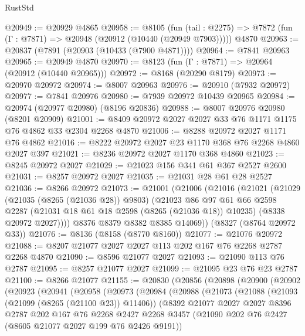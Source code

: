 \begin{lexlean}{RustStd}
\begin{coremodule}
{\begin{coremodule}
{{{{{{{{{{{{{{{{{{{{{{{{{{{{{{{{{{{{{{{{{{{{{{{{{{{{{{@20949 := @20929 @4865
@20958 := @8105
    (fun (tail : @2275) => @7872 (fun (Γ : @7871) => @20948 (@20912 (@10440 (@20949 @7903)))))
    @4870
@20963 := @20837 (@7891 (@20903 (@10433 (@7900 @4871))))
@20964 := @7841 @20963
@20965 := @20949 @4870
@20970 := @8123 (fun (Γ : @7871) => @20964 (@20912 (@10440 @20965)))
@20972 := @8168 (@20290 @8179)
@20973 := @20970 @20972
@20974 := @8007 @20963
@20976 := @20910 (@7932 @20972)
@20977 := @7841 @20976
@20980 := @7939 @20972 @10439 @20965
@20984 := @20974 (@20977 @20980) (@8196 @20836)
@20988 := @8007 @20976 @20980 (@8201 @20909)
@21001 := @8409 @20972 @2027 @2027 @33 @76 @1171 @1175 @76 @4862 @33 @2304 @2268 @4870
@21006 := @8288 @20972 @2027 @1171 @76 @4862
@21016 := @8222 @20972 @2027 @23 @1170 @368 @76 @2268 @4860 @2027 @397
@21021 := @8236 @20972 @2027 @1170 @368 @4860
@21023 := @8245 @20972 @2027
@21029 := @21023 @156 @341 @61 @367 @2527 @2600
@21031 := @8257 @20972 @2027
@21035 := @21031 @28 @61 @28 @2527
@21036 := @8266 @20972
@21073 := @21001
    (@21006
      (@21016
        (@21021
          (@21029
            (@21035 (@8265 (@21036 @28)) @9803)
            (@21023
              @86
              @97
              @61
              @66
              @2598
              @2287
              (@21031 @18 @61 @18 @2598 (@8265 (@21036 @18)) @10235)
              (@8338 @20972 @2027))))
        @8376
        @8379
        @8382
        @8385
        @14069))
    (@8327 (@8764 @20972 @33))
@21076 := @8136 (@8158 (@8770 @8160))
@21077 := @21076 @20972
@21088 := @8207 @21077 @2027 @2027 @113 @202 @167 @76 @2268 @2787 @2268 @4870
@21090 := @8596 @21077 @2027
@21093 := @21090 @113 @76 @2787
@21095 := @8257 @21077 @2027
@21099 := @21095 @23 @76 @23 @2787
@21100 := @8266 @21077
@21155 := @20830
    (@20856
      (@20898
        (@20900
          (@20902
            (@20923
              (@20941
                (@20958
                  (@20973
                    (@20984
                      (@20988
                        (@21073
                          (@21088
                            (@21093 (@21099 (@8265 (@21100 @23)) @11406))
                            (@8392
                              @21077
                              @2027
                              @2027
                              @8396
                              @2787
                              @202
                              @167
                              @76
                              @2268
                              @2427
                              @2268
                              @3457
                              (@21090 @202 @76 @2427 (@8605 @21077 @2027 @199 @76 @2426 @9191))
}}}}}}}}}}}}}}}}}}}}}}}}}}}}}}}}}}}}}}}}}}}}}}}}}}}}}}
\end{coremodule}}
\end{coremodule}
\end{lexlean}
